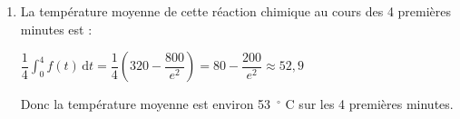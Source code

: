 \documentclass[10pt]{article}
\begin{document}
\begin{enumerate}
\begin{enumerate}
On pose $u(t) = 60 t + 40$ et $v'(t) = e^{-0{,}5 t}$ alors $u'(t)=60$ et $v(t)= -2 e^{-0{,}5 t}$.

les fonctions $u$ et $v$ sont dérivables et leurs fonctions dérivées sont continues donc d'après la formules d'intégration par parties :

$ \displaystyle\int_0^4 (60 t + 40) e^{-0{,}5t} \text{d}t  = \left[ (60 t + 40)(-2 e^{-0{,}5t}) \right]_0^4 - \int_0^4 -2 \times 60 e^{-0{,}5t} \text{d}t = \left[(-120t -80) e^{-0{,}5t}\right]_0^4 + 120 \int_0^4 e^{-0{,}5t} \text{d}t$

$= -560e^{-2} +80 + 120 \left[-2 e^{-0{,}5t}\right]_0^4  =-560e^{-2}  +80+ 120 (-2 e^{-2} + 2)  = -560 e^{-2} + 80  -240 e^{-2} + 240$

$= 320 - 800 e^{-2} = 320 -\dfrac{800}{\mathrm{e}^{2}}$.

		\item La température moyenne de cette réaction chimique au cours des 4 premières minutes est :

$\dfrac{1}{4}\displaystyle \int_0^4 f(t)\,\text{d}t =\dfrac{1}{4} \left(320 - \dfrac{800}{e^2} \right) = 80 - \dfrac{200}{e^2} \approx  52,9$

Donc la température moyenne est environ 53~\ensuremath{^\circ} C sur les 4 premières minutes.
	\end{enumerate}
\end{enumerate}
\end{document}

